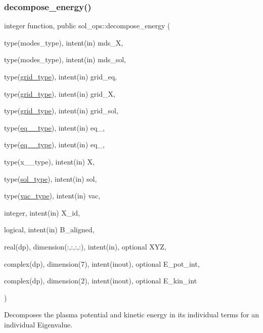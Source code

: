 \subsubsection{\texorpdfstring{decompose\+\_\+energy()}{decompose\_energy()}}
{\footnotesize\ttfamily integer function, public sol\+\_\+ops\+::decompose\+\_\+energy (\begin{DoxyParamCaption}\item[{type(modes\+\_\+type), intent(in)}]{mds\+\_\+X,  }\item[{type(modes\+\_\+type), intent(in)}]{mds\+\_\+sol,  }\item[{type(\hyperlink{structgrid__vars_1_1grid__type}{grid\+\_\+type}), intent(in)}]{grid\+\_\+eq,  }\item[{type(\hyperlink{structgrid__vars_1_1grid__type}{grid\+\_\+type}), intent(in)}]{grid\+\_\+X,  }\item[{type(\hyperlink{structgrid__vars_1_1grid__type}{grid\+\_\+type}), intent(in)}]{grid\+\_\+sol,  }\item[{type(\hyperlink{structeq__vars_1_1eq__1__type}{eq\+\_\+1\+\_\+type}), intent(in)}]{eq\+\_,  }\item[{type(\hyperlink{structeq__vars_1_1eq__2__type}{eq\+\_\+2\+\_\+type}), intent(in)}]{eq\+\_,  }\item[{type(x\+\_\+1\+\_\+type), intent(in)}]{X,  }\item[{type(\hyperlink{structsol__vars_1_1sol__type}{sol\+\_\+type}), intent(in)}]{sol,  }\item[{type(\hyperlink{structvac__vars_1_1vac__type}{vac\+\_\+type}), intent(in)}]{vac,  }\item[{integer, intent(in)}]{X\+\_\+id,  }\item[{logical, intent(in)}]{B\+\_\+aligned,  }\item[{real(dp), dimension(\+:,\+:,\+:,\+:), intent(in), optional}]{X\+YZ,  }\item[{complex(dp), dimension(7), intent(inout), optional}]{E\+\_\+pot\+\_\+int,  }\item[{complex(dp), dimension(2), intent(inout), optional}]{E\+\_\+kin\+\_\+int }\end{DoxyParamCaption})}



Decomposes the plasma potential and kinetic energy in its individual terms for an individual Eigenvalue. 

